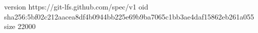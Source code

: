 version https://git-lfs.github.com/spec/v1
oid sha256:5bf02c212aacea8df4b0944bb225e69b9ba7065c1bb3ae4daf15862eb261a055
size 22000

